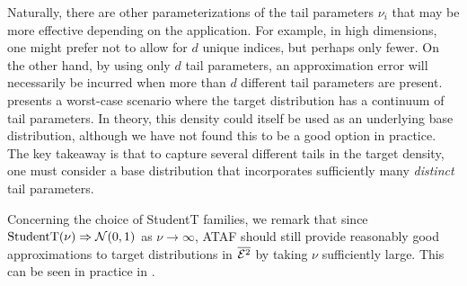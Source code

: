 \documentclass[thesis.tex]{subfiles}
\begin{document}

Naturally, there are other parameterizations of the tail parameters $\nu_i$ that may be more effective depending on the application. For example, in high dimensions, one might prefer not to allow for $d$ unique indices, but perhaps only fewer. On the other hand, by using only $d$ tail parameters, an approximation error will necessarily be incurred when more than $d$ different tail parameters are present.  presents a worst-case scenario where the target distribution has a continuum of tail parameters. In theory, this density could itself be used as an underlying base distribution, although we have not found this to be a good option in practice. The key takeaway is that to capture several different tails in the target density, one must consider a base distribution that incorporates sufficiently many \emph{distinct} tail parameters. 

Concerning the choice of StudentT families, we remark that since $\text{StudentT}(\nu) \Rightarrow \mathcal{N}(0,1)$ 
as $\nu \to \infty$, ATAF should still provide reasonably good approximations to target 
distributions in $\overline{\mathcal{E}^2}$ by taking $\nu$ sufficiently large. This can be seen in practice in .

\end{document}
